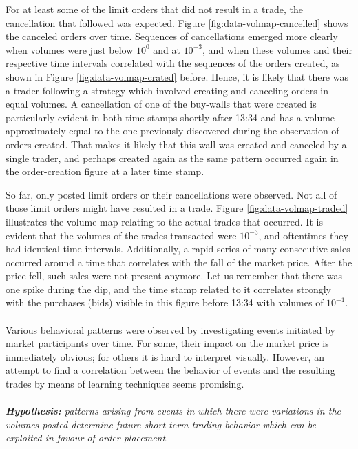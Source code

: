 For at least some of the limit orders that did not result in a trade, the cancellation that followed was expected.
Figure \ref{fig:data-volmap-cancelled} shows the canceled orders over time.
Sequences of cancellations emerged more clearly when volumes were just below $10^0$ and at $10^{-3}$, and when these volumes and their respective time intervals correlated with the sequences of the orders created, as shown in Figure \ref{fig:data-volmap-crated} before.
Hence, it is likely that there was a trader following a strategy which involved creating and canceling orders in equal volumes\cite{biais1995empirical}.
A cancellation of one of the buy-walls that were created is particularly evident in both time stamps shortly after 13:34 and has a volume approximately equal to the one previously discovered during the observation of orders created.
That makes it likely that this wall was created and canceled by a single trader, and perhaps created again as the same pattern occurred again in the order-creation figure at a later time stamp.

So far, only posted limit orders or their cancellations were observed.
Not all of those limit orders might have resulted in a trade. Figure \ref{fig:data-volmap-traded} illustrates the volume map relating to the actual trades that occurred.
It is evident that the volumes of the trades transacted were $10^{-3}$, and oftentimes they had identical time intervals.
Additionally, a rapid series of many consecutive sales occurred around a time that correlates with the fall of the market price.
After the price fell, such sales were not present anymore.
Let us remember that there was one spike during the dip, and the time stamp related to it correlates strongly with the purchases (bids) visible in this figure before 13:34 with volumes of $10^{-1}$.
\\
\\
Various behavioral patterns were observed by investigating events initiated by market participants over time.
For some, their impact on the market price is immediately obvious; for others it is hard to interpret visually.
However, an attempt to find a correlation between the behavior of events and the resulting trades by means of learning techniques seems promising.
\\
\\
\textit{\textbf{Hypothesis:} patterns arising from events in which there were variations in the volumes posted determine future short-term trading behavior which can be exploited in favour of order placement.}


